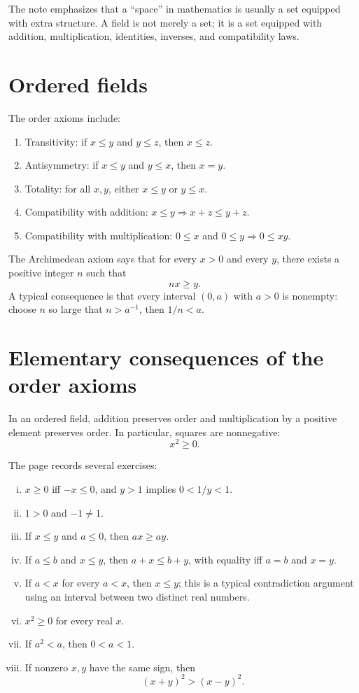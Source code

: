 The note emphasizes that a ``space'' in mathematics is usually a set equipped with extra structure.  A field is not merely a set; it is a set equipped with addition, multiplication, identities, inverses, and compatibility laws.

\section{Ordered fields}

The order axioms include:
\begin{enumerate}[(O1)]
  \item Transitivity: if \(x\le y\) and \(y\le z\), then \(x\le z\).
  \item Antisymmetry: if \(x\le y\) and \(y\le x\), then \(x=y\).
  \item Totality: for all \(x,y\), either \(x\le y\) or \(y\le x\).
  \item Compatibility with addition: \(x\le y\Rightarrow x+z\le y+z\).
  \item Compatibility with multiplication: \(0\le x\) and \(0\le y\Rightarrow0\le xy\).
\end{enumerate}

The Archimedean axiom says that for every \(x>0\) and every \(y\), there exists a positive integer \(n\) such that
\[
  nx\ge y.
\]
A typical consequence is that every interval \((0,a)\) with \(a>0\) is nonempty: choose \(n\) so large that \(n>a^{-1}\), then \(1/n<a\).

\section{Elementary consequences of the order axioms}

\begin{proposition}
In an ordered field, addition preserves order and multiplication by a positive element preserves order.  In particular, squares are nonnegative:
\[
  x^2\ge0.
\]
\end{proposition}


The page records several exercises:
\begin{enumerate}[(i)]
  \item \(x\ge0\) iff \(-x\le0\), and \(y>1\) implies \(0<1/y<1\).
  \item \(1>0\) and \(-1\neq1\).
  \item If \(x\le y\) and \(a\le0\), then \(ax\ge ay\).
  \item If \(a\le b\) and \(x\le y\), then \(a+x\le b+y\), with equality iff \(a=b\) and \(x=y\).
  \item If \(a<x\) for every \(a<x\), then \(x\le y\); this is a typical contradiction argument using an interval between two distinct real numbers.
  \item \(x^2\ge0\) for every real \(x\).
  \item If \(a^2<a\), then \(0<a<1\).
  \item If nonzero \(x,y\) have the same sign, then
  \[
    (x+y)^2>(x-y)^2.
  \]
\end{enumerate}

